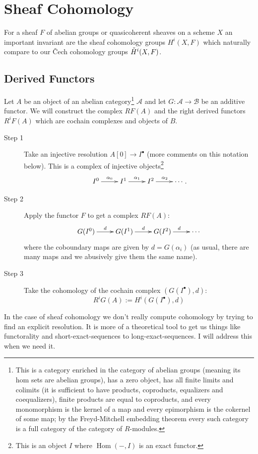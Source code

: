 \documentclass[12pt]{article}
\numberwithin{equation}{section}
\theoremstyle{definition}
\theoremstyle{remark}
\newcommand{\Hom}{\operatorname{Hom}}
\newcommand{\Hv}{\Check{H}}
\begin{document}
\section{Sheaf Cohomology}
For a sheaf $F$ of abelian groups or quasicoherent sheaves on a scheme $X$ an important invariant are the sheaf cohomology groups $H^i(X,F)$ which naturally compare to our \v{C}ech cohomology groups $\Hv^i(X,F)$.

\subsection{Derived Functors}
Let $A$ be an object of an abelian category\footnote{
This is a category enriched in the category of abelian groups (meaning its hom sets are abelian groups), has a zero object, has all finite limits and colimits (it is sufficient to have products, coproducts, equalizers and coequalizers), finite products are equal to coproducts, and every monomorphism is the kernel of a map and every epimorphism is the cokernel of some map; by the Freyd-Mitchell embedding theorem every such category is a full category of the category of $R$-modules. 
} $\mathcal{A}$ and let $G: \mathcal{A} \to \mathcal{B}$ be an additive functor. 
We will construct the complex $RF(A)$ and the right derived functors $R^iF(A)$ which are cochain complexes and objects of $B$. 
\begin{description}
	\item[Step 1] Take an injective resolution $A[0] \to I^{\bullet}$ (more comments on this notation below).
	This is a complex of injective objects\footnote{This is an object $I$ where $\Hom(-,I)$ is an exact functor. }
	$$
	\xymatrix{
	 I^0 \ar[r]^{\alpha_0} & I^1 \ar[r]^{\alpha_1} & I^2 \ar[r]^{\alpha_2} & \cdots 
	}.$$
	\item[Step 2] Apply the functor $F$ to get a complex $RF(A)$:
	$$
\xymatrix{
	G(I^0) \ar[r]^{d} & G(I^1) \ar[r]^{d} & G(I^2) \ar[r]^{d} & \cdots 
}$$
where the coboundary maps are given by $d=G(\alpha_i)$ (as usual, there are many maps and we abusively give them the same name).
	\item[Step 3] Take the cohomology of the cochain complex $(G(I^{\bullet}), d)$:
	  $$ R^iG(A) := H^i( G(I^{\bullet}),d)$$
\end{description}
In the case of sheaf cohomology we don't really compute cohomology by trying to find an explicit resolution. It is more of a theoretical tool to get us things like functorality and short-exact-sequences to long-exact-sequences.
I will address this when we need it.
\end{document}

